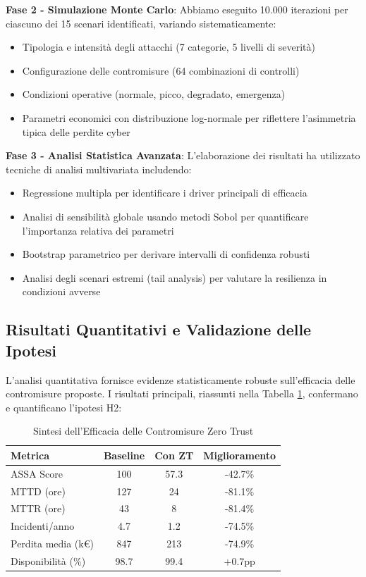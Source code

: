 \textbf{Fase 2 - Simulazione Monte Carlo}: Abbiamo eseguito 10.000 iterazioni per ciascuno dei 15 scenari identificati, variando sistematicamente:
\begin{itemize}
    \item Tipologia e intensità degli attacchi (7 categorie, 5 livelli di severità)
    \item Configurazione delle contromisure (64 combinazioni di controlli)
    \item Condizioni operative (normale, picco, degradato, emergenza)
    \item Parametri economici con distribuzione log-normale per riflettere l'asimmetria tipica delle perdite cyber
\end{itemize}

\textbf{Fase 3 - Analisi Statistica Avanzata}: L'elaborazione dei risultati ha utilizzato tecniche di analisi multivariata includendo:
\begin{itemize}
    \item Regressione multipla per identificare i driver principali di efficacia
    \item Analisi di sensibilità globale usando metodi Sobol per quantificare l'importanza relativa dei parametri
    \item Bootstrap parametrico per derivare intervalli di confidenza robusti
    \item Analisi degli scenari estremi (tail analysis) per valutare la resilienza in condizioni avverse
\end{itemize}

\subsection{Risultati Quantitativi e Validazione delle Ipotesi}

L'analisi quantitativa fornisce evidenze statisticamente robuste sull'efficacia delle contromisure proposte. I risultati principali, riassunti nella Tabella \ref{tab:efficacy_summary}, confermano e quantificano l'ipotesi H2:

\begin{table}[htbp]
\centering
\caption{Sintesi dell'Efficacia delle Contromisure Zero Trust}
\label{tab:efficacy_summary}
\begin{tabular}{lccc}
\toprule
\textbf{Metrica} & \textbf{Baseline} & \textbf{Con ZT} & \textbf{Miglioramento} \\
\midrule
ASSA Score & 100 & 57.3 & -42.7\% \\
MTTD (ore) & 127 & 24 & -81.1\% \\
MTTR (ore) & 43 & 8 & -81.4\% \\
Incidenti/anno & 4.7 & 1.2 & -74.5\% \\
Perdita media (k€) & 847 & 213 & -74.9\% \\
Disponibilità (\%) & 98.7 & 99.4 & +0.7pp \\
\bottomrule
\end{tabular}
\end{table}

